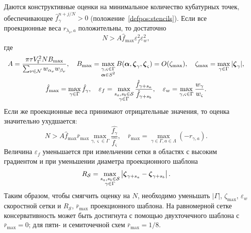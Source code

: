 Даются конструктивные оценки на минимальное количество кубатурных точек,
обеспечивающее \(\hat{f}_\gamma^{n+j/N}>0\) (положение~\ref{defpos:stencils}).
Если все проекционные веса \(r_{\lambda_\nu,a}\) положительны, то достаточно
\begin{equation*}
    N > A \hat{f}_{\max} \varepsilon_f^2 \varepsilon_w^2,
\end{equation*}
где
\begin{gather*}
    A = \frac{\pi\tau V_\Gamma^2 N B_{\max}}{\sum_{\nu\in\mathcal{N}} w_{\alpha_\nu}w_{\beta_\nu}}, \quad
    B_{\max} = \max_{\substack{\gamma,\varsigma\in\Gamma\\\boldsymbol{\alpha}\in S^2}}
        B(\boldsymbol{\alpha}, {\boldsymbol{\zeta}}_{\gamma}, {\boldsymbol{\zeta}}_{\varsigma}) = O(\zeta_{\max}), \quad
    \zeta_{\max} = \max_{\gamma\in\Gamma}|{\boldsymbol{\zeta}}_\gamma|, \\
    \hat{f}_{\max} = \max_{\gamma\in\Gamma} \hat{f}_\gamma, \quad
    \varepsilon_f = \max_{\substack{s_a,s_b\in\mathcal{S}\\\gamma\in\Gamma}} \frac{\hat{f}_{\gamma+s_a}}{\hat{f}_{\gamma+s_b}}, \quad
    \varepsilon_w = \max_{\gamma,\varsigma\in\Gamma} \frac{w_\gamma}{w_\varsigma}.
\end{gather*}
Если же проекционные веса принимают отрицательные значения, то оценка значительно ухудшается:
\begin{equation*}
    N > A \hat{f}_{\max} \bar{r}_{\max} \max_{\gamma,\varsigma\in\Gamma}\frac{\hat{f_\gamma}}{\hat{f_\varsigma}}, \quad
    \bar{r}_{\max} = \max_{\gamma\in\Gamma,a\in\Lambda}( -r_{\gamma,a} ).
\end{equation*}
Величина \(\varepsilon_f\) уменьшается при измельчении сетки в областях с высоким градиентом
и при уменьшении диаметра проекционного шаблона
\begin{equation*}
    R_\mathcal{S} = \max_{\substack{s_a,s_b\in\mathcal{S}\\\gamma\in\Gamma}}
        \left| {\boldsymbol{\zeta}}_{\gamma+s_a} - {\boldsymbol{\zeta}}_{\gamma+s_b} \right|.
\end{equation*}
Таким образом, чтобы смягчить оценку на \(N\),
необходимо уменьшать \(|\Gamma|\), \(\zeta_{\max}\), \(\varepsilon_w\) скоростной сетки
и \(R_\mathcal{S}\), \(\bar{r}_{\max}\) проекционного шаблона.
На равномерной сетке консервативность может быть достигнута с помощью двухточечного шаблона с \(\bar{r}_{\max}=0\);
для пяти- и семиточечной схем \(\bar{r}_{\max}=1/8\).

